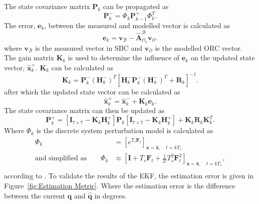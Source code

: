 The state covariance matrix $\mathbf{P}_k$ can be propagated as
\begin{equation}
\mathbf{P}_k^- = \Phi_k \mathbf{P}_{k-1}^+ \Phi_k ^T.
\label{eq:P_k}
\end{equation}
The error, $\mathbf{e}_k$, between the measured and modelled vector is calculated as
\begin{equation}
\mathbf{e}_k = \mathbf{v}_\mathcal{B} - \boldsymbol{\hat{A}}^{\mathcal{B}}_{\mathcal{O}_k} \mathbf{v}_\mathcal{O}.
\label{eq:errorVector}
\end{equation}
where $\mathbf{v}_\mathcal{B}$ is the measured vector in SBC and $\mathbf{v}_\mathcal{O}$ is the modelled ORC vector. The gain matrix $\mathbf{K}_k$ is used to determine the influence of $\mathbf{e}_k$ on the updated state vector, $\hat{\mathbf{x}}_k^+$. $\mathbf{K}_k$ can be calculated as 
\begin{equation}
\mathbf{K}_k = \mathbf{P}_k^- (\mathbf{H}_k^-)^T \left[\mathbf{H}_k^- \mathbf{P}_k^- (\mathbf{H}_k^-)^T + \mathbf{R}_k \right]^{-1}.
\end{equation}
after which the updated state vector can be calculated as
\begin{equation}
\hat{\mathbf{x}}_k^+ = \hat{\mathbf{x}}_k^- + \mathbf{K}_k \mathbf{e}_k.
\label{eq:UpdatedStateVector}
\end{equation}
The state covariance matrix can then be updated as
\begin{equation}
\mathbf{P}_k^+ = \left[\mathbf{I}_{7 \times 7} - \mathbf{K}_k \mathbf{H}_k^+ \right]\mathbf{P}_k \left[\mathbf{I}_{7 \times 7} - \mathbf{K}_k \mathbf{H}_k^+ \right] + \mathbf{K}_k \mathbf{R}_k \mathbf{K}_k^T.
\label{eq:Updated_P_k}
\end{equation}
Where $\Phi_k$ is the discrete system perturbation model is calculated as
\begin{equation}
\begin{aligned}
\Phi_k &= \left[e^{T_s\mathbf{F}_t}\right]_{\mathbf{x}=\mathbf{\hat{x}},\quad t = kT_s} \\
\text{and simplified as} \qquad \Phi_k &\approx \left[\mathbf{I} + T_s\mathbf{F}_t + \frac{1}{2!}T_s^2\mathbf{F}_t^2\right]_{\mathbf{x}=\mathbf{\hat{x}},\quad t = kT_s}, \\
\end{aligned}
\end{equation}
according to \cite{Steyn2004Notes}. To validate the results of the EKF, the estimation error is given in Figure~\ref{fig:Estimation Metric}. Where the estimation error is the difference between the current $\mathbf{q}$ and $\mathbf{\hat{q}}$ in degrees.

